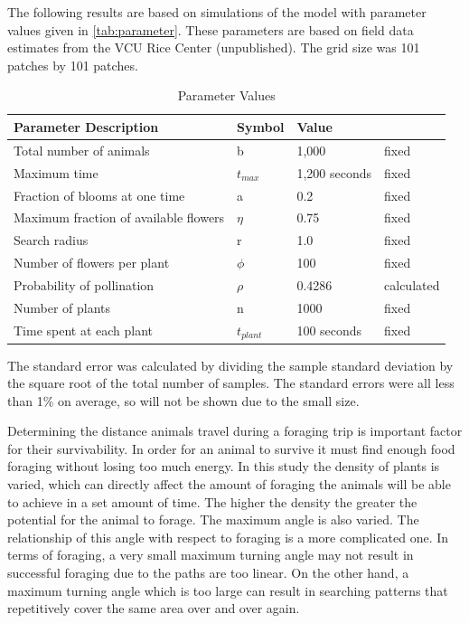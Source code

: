 The following results are based on simulations of the model with parameter values given in
\autoref{tab:parameter}.  These parameters are based on field data estimates from the VCU Rice Center
(unpublished).  The grid size was 101 patches by 101 patches.
\begin{table}
  \begin{tabular}{|l|l|l|l|}
    \hline
    Parameter Description & Symbol & Value &  \\ \hline  \label{parameter}
    Total number of animals & b & 1,000 & fixed  \\ \hline
    Maximum time & $t_{max}$ & 1,200 seconds & fixed \\ \hline
    Fraction of blooms at one time & a & 0.2 & fixed \\ \hline
    Maximum fraction of available flowers & $\eta$ & 0.75 & fixed \\ \hline
    Search radius & r & 1.0 & fixed \\ \hline
    Number of flowers per plant & $\phi$ & 100 & fixed \\ \hline
    Probability of pollination   & $\rho$ & 0.4286 & calculated \\ \hline
    Number of plants & n & 1000 & fixed \\ \hline
    Time spent at each plant & $t_{plant}$ & 100 seconds & fixed \\ \hline
  \end{tabular}
  \caption{Parameter Values}
  \label{tab:parameter}
\end{table}

The standard error was calculated by dividing the sample standard deviation by the square root of
the total number of samples.   The standard errors were all less than 1\% on average, so will not be
shown due to the small size.

Determining the distance animals travel during a foraging trip is important factor for their
survivability.  In order for an animal to survive it must find enough food foraging without losing
too much energy.  In this study the density of plants is varied, which can directly affect the
amount of foraging the animals will be able to achieve in a set amount of time.  The higher the
density the greater the potential for the animal to forage.  The maximum angle is also varied.  The
relationship of this angle with respect to foraging is a more complicated one.  In terms of
foraging, a very small maximum turning angle may not result in successful foraging due to the paths
are too linear.  On the other hand, a maximum turning angle which is too large can result in
searching patterns that repetitively cover the same area over and over again.

